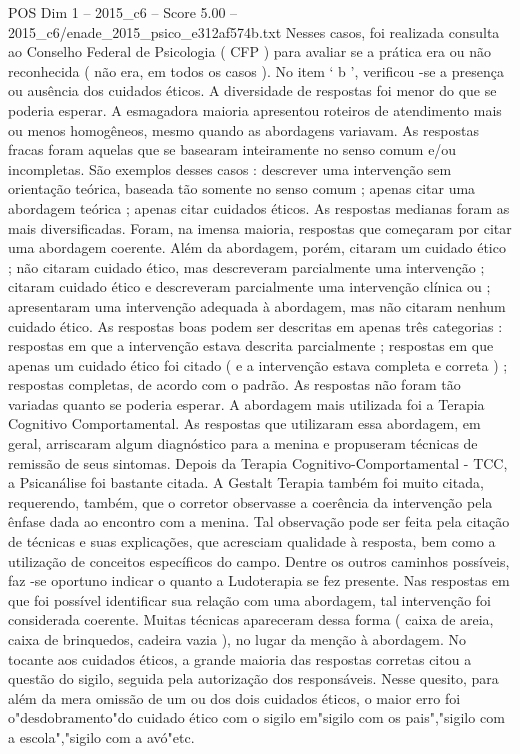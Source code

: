 \begin{textsample}{POS Dim 1 – 2015\_c6 – Score 5.00 – 2015\_c6/enade\_2015\_psico\_e312af574b.txt}
Nesses casos, foi realizada consulta ao Conselho Federal de Psicologia ( CFP ) para avaliar se a prática era ou não reconhecida ( não era, em todos os casos ).
No item ‘ b ’, verificou -se a presença ou ausência dos cuidados éticos.
A diversidade de respostas foi menor do que se poderia esperar.
A esmagadora maioria apresentou roteiros de atendimento mais ou menos homogêneos, mesmo quando as abordagens variavam.
As respostas fracas foram aquelas que se basearam inteiramente no senso comum e/ou incompletas.
São exemplos desses casos : descrever uma intervenção sem orientação teórica, baseada tão somente no senso comum ; apenas citar uma abordagem teórica ; apenas citar cuidados éticos.
As respostas medianas foram as mais diversificadas.
Foram, na imensa maioria, respostas que começaram por citar uma abordagem coerente.
Além da abordagem, porém, citaram um cuidado ético ; não citaram cuidado ético, mas descreveram parcialmente uma intervenção ; citaram cuidado ético e descreveram parcialmente uma intervenção clínica ou ; apresentaram uma intervenção adequada à abordagem, mas não citaram nenhum cuidado ético.
As respostas boas podem ser descritas em apenas três categorias : respostas em que a intervenção estava descrita parcialmente ; respostas em que apenas um cuidado ético foi citado ( e a intervenção estava completa e correta ) ; respostas completas, de acordo com o padrão.
As respostas não foram tão variadas quanto se poderia esperar.
A abordagem mais utilizada foi a Terapia Cognitivo Comportamental.
As respostas que utilizaram essa abordagem, em geral, arriscaram algum diagnóstico para a menina e propuseram técnicas de remissão de seus sintomas.
Depois da Terapia Cognitivo-Comportamental - TCC, a Psicanálise foi bastante citada.
A Gestalt Terapia também foi muito citada, requerendo, também, que o corretor observasse a coerência da intervenção pela ênfase dada ao encontro com a menina.
Tal observação pode ser feita pela citação de técnicas e suas explicações, que acresciam qualidade à resposta, bem como a utilização de conceitos específicos do campo.
Dentre os outros caminhos possíveis, faz -se oportuno indicar o quanto a Ludoterapia se fez presente.
Nas respostas em que foi possível identificar sua relação com uma abordagem, tal intervenção foi considerada coerente.
Muitas técnicas apareceram dessa forma ( caixa de areia, caixa de brinquedos, cadeira vazia ), no lugar da menção à abordagem.
No tocante aos cuidados éticos, a grande maioria das respostas corretas citou a questão do sigilo, seguida pela autorização dos responsáveis.
Nesse quesito, para além da mera omissão de um ou dos dois cuidados éticos, o maior erro foi o"desdobramento"do cuidado ético com o sigilo em"sigilo com os pais","sigilo com a escola","sigilo com a avó"etc.

\end{textsample}

